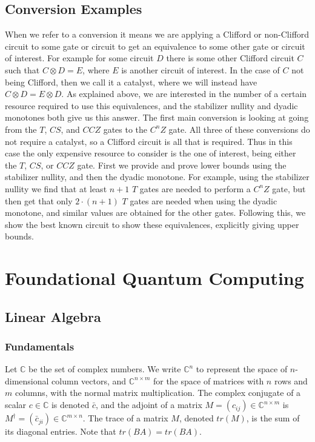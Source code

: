 \documentclass[12pt]{dalthesis}
\begin{document}
\section{Conversion Examples}
When we refer to a conversion it means we are applying a Clifford or non-Clifford circuit to some gate or circuit to get an equivalence to some other gate or circuit of interest. For example for some circuit $D$ there is some other Clifford circuit $C$ such that $C \otimes D = E$, where $E$ is another circuit of interest. In the case of $C$ not being Clifford, then we call it a catalyst, where we will instead have $C \otimes D = E \otimes D$. As explained above, we are interested in the number of a certain resource required to use this equivalences, and the stabilizer nullity and dyadic monotones both give us this answer. 
The first main conversion is looking at going from the $T$, $CS$, and $CCZ$ gates to the $C^nZ$ gate. All three of these conversions do not require a catalyst, so a Clifford circuit is all that is required. Thus in this case the only expensive resource to consider is the one of interest, being either the $T$, $CS$, or $CCZ$ gate. First we provide and prove lower bounds using the stabilizer nullity, and then the dyadic monotone. For example, using the stabilizer nullity we find that at least $n+1$ $T$ gates are needed to perform a $C^nZ$ gate, but then get that only $2\cdot (n+1)$ $T$ gates are needed when using the dyadic monotone, and similar values are obtained for the other gates. Following this, we show the best known circuit to show these equivalences, explicitly giving upper bounds.

\chapter{Foundational Quantum Computing}
\section{Linear Algebra}
\subsection{Fundamentals}
Let $\mathbb{C}$ be the set of complex numbers. We write $\mathbb{C}^n$ to represent the space of $n$-dimensional column vectors, and $\mathbb{C}^{n \times m}$ for the space of matrices with $n$ rows and $m$ columns, with the normal matrix multiplication. The complex conjugate of a scalar $c \in \mathbb{C}$ is denoted $\bar{c}$, and the adjoint of a matrix $M = (c_{ij}) \in \mathbb{C}^{n \times m}$ is $M^\dag = (\bar{c}_{ji}) \in \mathbb{C}^{m \times n}$. The trace of a matrix $M$, denoted $tr(M)$, is the sum of its diagonal entries. Note that $tr(BA) = tr(BA)$. 
\end{document}
